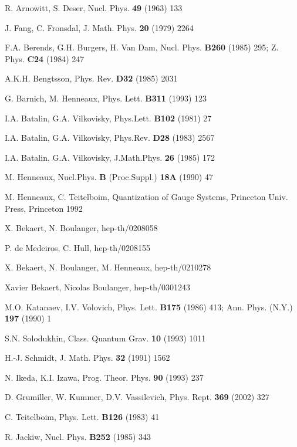\documentclass[a4paper,12pt]{article}
\begin{document}
\begin{thebibliography}{99}
  R. Arnowitt, S. Deser, Nucl. Phys. \textbf{49} (1963) 133

  J. Fang, C. Fronsdal, J. Math. Phys. \textbf{20} (1979)
2264

  F.A. Berends, G.H. Burgers, H. Van Dam, Nucl. Phys. \textbf{%
B260} (1985) 295; Z. Phys. \textbf{C24} (1984) 247

  A.K.H. Bengtsson, Phys. Rev. \textbf{D32} (1985) 2031

  G. Barnich, M. Henneaux, Phys. Lett. \textbf{B311} (1993) 123

  I.A. Batalin, G.A. Vilkovisky, Phys.Lett. \textbf{B102} (1981)
27

  I.A. Batalin, G.A. Vilkovisky, Phys.Rev. \textbf{D28} (1983)
2567

  I.A. Batalin, G.A. Vilkovisky, J.Math.Phys. \textbf{26} (1985)
172

  M. Henneaux, Nucl.Phys. \textbf{B }(Proc.Suppl.) \textbf{18A}
(1990) 47

  M. Henneaux, C. Teitelboim, Quantization of Gauge Systems,
Princeton Univ. Press, Princeton 1992

  X. Bekaert, N. Boulanger, hep-th/0208058

  P. de Medeiros, C. Hull, hep-th/0208155

  X. Bekaert, N. Boulanger, M. Henneaux, hep-th/0210278

 Xavier Bekaert, Nicolas Boulanger, hep-th/0301243

  M.O. Katanaev, I.V. Volovich, Phys. Lett. \textbf{B175}
(1986) 413; Ann. Phys. (N.Y.) \textbf{197} (1990) 1

  S.N. Solodukhin, Class. Quantum Grav. \textbf{10} (1993) 1011

  H.-J. Schmidt, J. Math. Phys. \textbf{32} (1991) 1562

  N. Ikeda, K.I. Izawa, Prog. Theor. Phys. \textbf{90} (1993)
237

  D. Grumiller, W. Kummer, D.V. Vassilevich, Phys. Rept.
\textbf{369} (2002) 327

  C. Teitelboim, Phys. Lett. \textbf{B126} (1983) 41

  R. Jackiw, Nucl. Phys. \textbf{B252} (1985) 343


\end{thebibliography}
\end{document}
